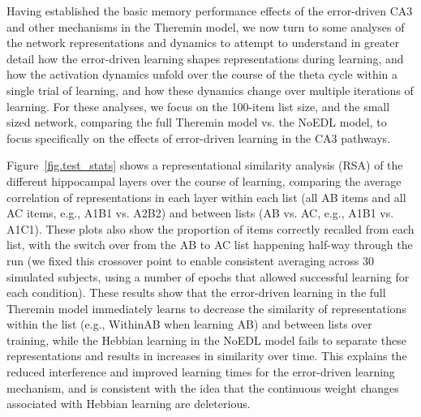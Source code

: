 \documentclass[11pt,twoside]{article}
\newif\myifpdf
\begin{document}
Having established the basic memory performance effects of the error-driven CA3 and other mechanisms in the Theremin model, we now turn to some analyses of the network representations and dynamics to attempt to understand in greater detail how the error-driven learning shapes representations during learning, and how the activation dynamics unfold over the course of the theta cycle within a single trial of learning, and how these dynamics change over multiple iterations of learning.  For these analyses, we focus on the 100-item list size, and the small sized network, comparing the full Theremin model vs. the NoEDL model, to focus specifically on the effects of error-driven learning in the CA3 pathways.

Figure~\ref{fig.test_stats} shows a representational similarity analysis (RSA) of the different hippocampal layers over the course of learning, comparing the average correlation of representations in each layer within each list (all AB items and all AC items, e.g., A1B1 vs. A2B2) and between lists (AB vs. AC, e.g., A1B1 vs. A1C1).  These plots also show the proportion of items correctly recalled from each list, with the switch over from the AB to AC list happening half-way through the run (we fixed this crossover point to enable consistent averaging across 30 simulated subjects, using a number of epochs that allowed successful learning for each condition).  These results show that the error-driven learning in the full Theremin model immediately learns to decrease the similarity of representations within the list (e.g., WithinAB when learning AB) and between lists over training, while the Hebbian learning in the NoEDL model fails to separate these representations and results in increases in similarity over time.  This explains the reduced interference and improved learning times for the error-driven learning mechanism, and is consistent with the idea that the continuous weight changes associated with Hebbian learning are deleterious.
\end{document}
